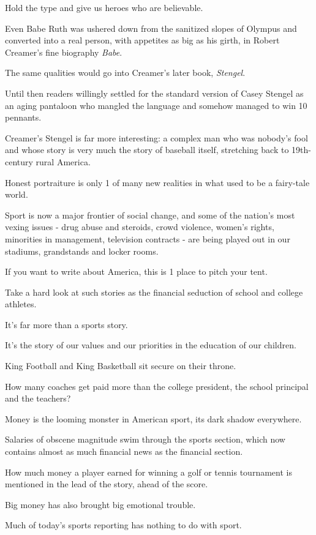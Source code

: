 \documentclass{book}
\numberwithin{equation}{section}
\begin{document}
Hold the type and give us heroes who are believable.

%
Even Babe Ruth was ushered down from the sanitized slopes of Olympus and converted into a real person, with appetites as big as his girth, in Robert Creamer's fine biography \textit{Babe}.

The same qualities would go into Creamer's later book, \textit{Stengel}.

Until then readers willingly settled for the standard version of Casey Stengel as an aging pantaloon who mangled the language and somehow managed to win 10 pennants.

Creamer's Stengel is far more interesting: a complex man who was nobody's fool and whose story is very much the story of baseball itself, stretching back to 19th-century rural America.

%
Honest portraiture is only 1 of many new realities in what used to be a fairy-tale world.

Sport is now a major frontier of social change, and some of the nation's most vexing issues - drug abuse and steroids, crowd violence, women's rights, minorities in management, television contracts - are being played out in our stadiums, grandstands and locker rooms.

If you want to write about America, this is 1 place to pitch your tent.

Take a hard look at such stories as the financial seduction of school and college athletes.

It's far more than a sports story.

It's the story of our values and our priorities in the education of our children.

King Football and King Basketball sit secure on their throne.

How many coaches get paid more than the college president, the school principal and the teachers?

%
Money is the looming monster in American sport, its dark shadow everywhere.

Salaries of obscene magnitude swim through the sports section, which now contains almost as much financial news as the financial section.

How much money a player earned for winning a golf or tennis tournament is mentioned in the lead of the story, ahead of the score.

Big money has also brought big emotional trouble.

Much of today's sports reporting has nothing to do with sport.
\end{document}

